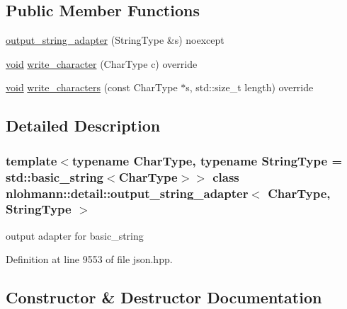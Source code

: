 \subsection*{Public Member Functions}
\begin{DoxyCompactItemize}
\item 
\mbox{\hyperlink{classnlohmann_1_1detail_1_1output__string__adapter_af3a49ecd0d23fe56ac21e13d8752abc7}{output\+\_\+string\+\_\+adapter}} (String\+Type \&s) noexcept
\item 
\mbox{\hyperlink{namespacenlohmann_1_1detail_a59fca69799f6b9e366710cb9043aa77d}{void}} \mbox{\hyperlink{classnlohmann_1_1detail_1_1output__string__adapter_a2d76cc6c88ddbc196a63fcfcac9ee7d1}{write\+\_\+character}} (Char\+Type c) override
\item 
\mbox{\hyperlink{namespacenlohmann_1_1detail_a59fca69799f6b9e366710cb9043aa77d}{void}} \mbox{\hyperlink{classnlohmann_1_1detail_1_1output__string__adapter_ab5ea4da075305d225dfd84ad997e8747}{write\+\_\+characters}} (const Char\+Type $\ast$s, std\+::size\+\_\+t length) override
\end{DoxyCompactItemize}


\subsection{Detailed Description}
\subsubsection*{template$<$typename Char\+Type, typename String\+Type = std\+::basic\+\_\+string$<$\+Char\+Type$>$$>$\newline
class nlohmann\+::detail\+::output\+\_\+string\+\_\+adapter$<$ Char\+Type, String\+Type $>$}

output adapter for basic\+\_\+string 

Definition at line 9553 of file json.\+hpp.



\subsection{Constructor \& Destructor Documentation}
\mbox{\label{classnlohmann_1_1detail_1_1output__string__adapter_af3a49ecd0d23fe56ac21e13d8752abc7}} 
